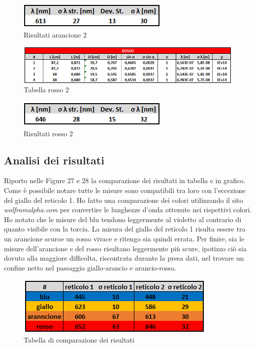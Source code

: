 \documentclass{article}
\begin{document}
\begin{figure}[h!]
  \centering
  \includegraphics[width=0.4\linewidth]{IM risultati arancio 2}
  \caption{Risultati arancione 2}
\end{figure}

\begin{figure}[h!]
  \centering
  \includegraphics[width=1\linewidth]{IM tabella rosso 2}
  \caption{Tabella rosso 2}
\end{figure}

\clearpage
\begin{figure}[t]
  \centering
  \includegraphics[width=0.4\linewidth]{IM risultati rosso 2}
  \caption{Risultati rosso 2}
\end{figure}


\subsection{Analisi dei risultati}
Riporto nelle Figure 27 e 28 la comparazione dei risultati in tabella e in grafico. Come è possibile notare tutte le misure sono compatibili tra loro con l'eccezione del giallo del reticolo 1. Ho fatto una comparazione dei colori utilizzando il sito \textit{wolframalpha.com} per convertire le lunghezze d'onda ottenute nei rispettivi colori. Ho notato che le misure del blu tendono leggermente al violetto al contrario di quanto visibile con la torcia. La misura del giallo del reticolo 1 risulta essere tra un arancione scuroe un rosso vivace e ritengo sia quindi errata. Per finire, sia le misure dell'arancione e del  rosso risultano leggermente più scure, ipotizzo ciò sia dovuto alla maggiore difficolta, riscontrata durante la presa dati, nel trovare un confine netto nel passaggio giallo-arancio e arancio-rosso.


\begin{figure}[h!]
  \centering
  \includegraphics[width=0.5\linewidth]{IM comparazione risultati}
  \caption{Tabella di comparazione dei risultati}
\end{figure}
\end{document}
